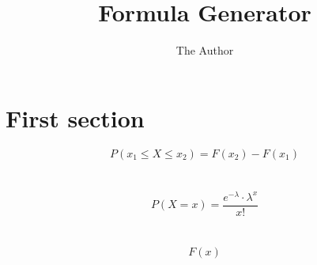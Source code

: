 \documentclass[11pt]{article} %
\title{Formula Generator}
\author{The Author}
\begin{document}
\maketitle

\section{First section}

\[P(x_1\leq X\leq x_2) = F(x_2)-F(x_1)\]

\section{}

\[P(X=x)=\frac{e^{-\lambda}\cdot\lambda^x}{x!}\]

\section{}

\[F(x)\]
\end{document}
